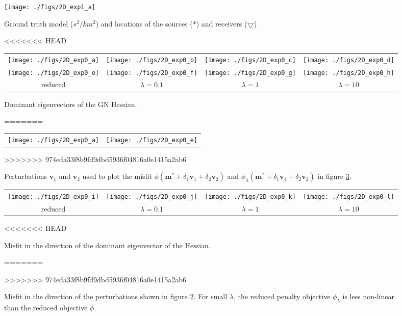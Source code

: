\documentclass{iopart}
\begin{document}
{\begin{figure}
\centering
\texttt{[image: ./figs/2D\_exp1\_a]}\\
\caption{Ground truth model ($s^2/km^2$) and locations of the sources ($*$) and receivers ($\bigtriangledown$)}
\label{fig:2D_model}
\end{figure}

\begin{figure}
\centering
<<<<<<< HEAD
\begin{tabular}{cccc}
\texttt{[image: ./figs/2D\_exp0\_a]}&
\texttt{[image: ./figs/2D\_exp0\_b]}&
\texttt{[image: ./figs/2D\_exp0\_c]}&
\texttt{[image: ./figs/2D\_exp0\_d]}\\
\texttt{[image: ./figs/2D\_exp0\_e]}&
\texttt{[image: ./figs/2D\_exp0\_f]}&
\texttt{[image: ./figs/2D\_exp0\_g]}&
\texttt{[image: ./figs/2D\_exp0\_h]}\\
{\small reduced}&{\small $\lambda=0.1$}&{\small $\lambda=1$}&{\small $\lambda=10$}\\
\end{tabular}
\caption{Dominant eigenvectors of the GN Hessian.}
=======
\begin{tabular}{cc}
\texttt{[image: ./figs/2D\_exp0\_a]}&
\texttt{[image: ./figs/2D\_exp0\_e]}\\
\end{tabular}
\caption{Perturbations $\mathbf{v}_1$ and $\mathbf{v}_2$ used to plot the misfit $\phi(\mathbf{m}^* + \delta_1\mathbf{v}_1 + \delta_2\mathbf{v}_2)$ and $\phi_{\lambda}(\mathbf{m}^* + \delta_1\mathbf{v}_1 + \delta_2\mathbf{v}_2)$ in figure \ref{fig:2D_exp0b}.}
>>>>>>> 974eda33f8b9fd9dbd5936f04816a0e1415a2ab6
\label{fig:2D_exp0a}
\end{figure}

\begin{figure}
\centering
\begin{tabular}{cccc}
\texttt{[image: ./figs/2D\_exp0\_i]}&
\texttt{[image: ./figs/2D\_exp0\_j]}&
\texttt{[image: ./figs/2D\_exp0\_k]}&
\texttt{[image: ./figs/2D\_exp0\_l]}\\
{\small reduced}&{\small $\lambda=0.1$}&{\small $\lambda=1$}&{\small $\lambda=10$}\\
\end{tabular}
<<<<<<< HEAD
\caption{Misfit in the direction of the dominant eigenvector of the Hessian.}
=======
\caption{Misfit in the direction of the perturbations shown in figure \ref{fig:2D_exp0a}. For small $\lambda$, the reduced penalty objective $\phi_{\lambda}$ is less non-linear than the reduced objective $\phi$.}
>>>>>>> 974eda33f8b9fd9dbd5936f04816a0e1415a2ab6
\label{fig:2D_exp0b}
\end{figure}


}
\end{document}

